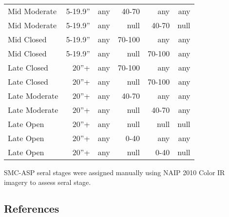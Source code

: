 \begin{table}[hbp]
\begin{tabular}{@{}lrrrrr@{}}
Mid Moderate     & 5-19.9''        & any & 40-70  & any    & any  \\
Mid Moderate     & 5-19.9''        & any & null   & 40-70  & null \\
Mid Closed       & 5-19.9''        & any & 70-100 & any    & any  \\
Mid Closed       & 5-19.9''        & any & null   & 70-100 & any  \\
Late Closed      & 20''+           & any & 70-100 & any    & any  \\
Late Closed      & 20''+           & any & null   & 70-100 & any  \\
Late Moderate    & 20''+           & any & 40-70  & any    & any  \\
Late Moderate    & 20''+           & any & null   & 40-70  & any  \\
Late Open        & 20''+           & any & null   & null   & null \\
Late Open        & 20''+           & any & 0-40   & any    & any  \\
Late Open        & 20''+           & any & null   & 0-40   & null  \\ \bottomrule
\end{tabular}
\end{table}

SMC-ASP seral stages were assigned manually using NAIP 2010 Color IR imagery to assess seral stage.



\clearpage

\subsection*{References}

